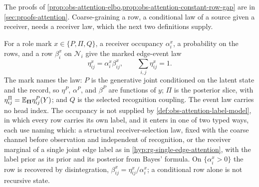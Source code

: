 The proofs of \cref{prop:obs-attention-elbo,prop:obs-attention-constant-row-gap} are in \cref{sec:proofs-attention}.
Coarse-graining a row, a conditional law of a source given a receiver, needs a
receiver law, which the next two definitions supply.

For a role mark \(x\in\{P,\Pi,Q\}\), a receiver occupancy \(\alpha^x_i\), a
probability on the rows, and a row \(\beta^x_i\) on \(\mathcal N_i\) give the
marked edge-event law
\begin{equation}
\eta^x_{ij}=\alpha^x_i\beta^x_{ij},
\qquad
\sum_{i,j}\eta^x_{ij}=1.
\label{eq:rg-attention-event-law}
\end{equation}
The mark names the law: \(P\) is the generative joint conditioned on the latent
state and the record, so \(\eta^P\), \(\alpha^P\), and \(\beta^P\) are
functions of \(y\); \(\Pi\) is the posterior slice, with
\(\eta^\Pi_{ij}=\mathbb E_{\boldsymbol\Pi}\eta^P_{ij}(Y)\); and \(Q\) is the selected
recognition coupling. The event law carries no head index. The occupancy is
not supplied by \cref{def:obs-attention-label-model}, in which every row
carries its own label, and it enters in one of two typed ways, each use naming
which: a structural receiver-selection law, fixed with the coarse channel
before observation and independent of recognition, or the receiver marginal of
a single joint edge label as in \cref{hyp:rg-single-edge-attention}, with the
label prior as its prior and its posterior from Bayes' formula. On
\(\{\alpha^x_i>0\}\) the row is recovered by disintegration,
\(\beta^x_{ij}=\eta^x_{ij}/\alpha^x_i\); a conditional row alone is not
recursive state.

